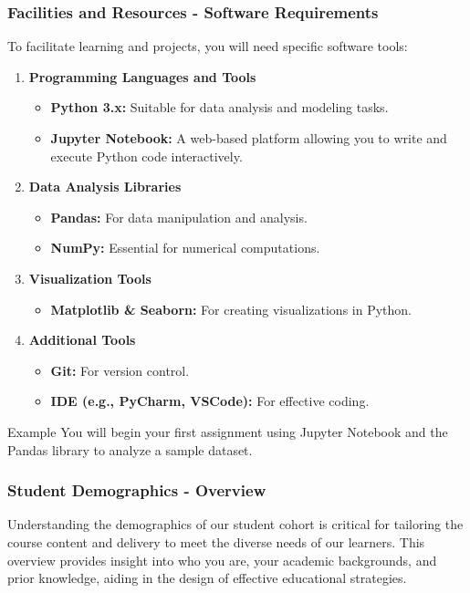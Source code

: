 \documentclass[aspectratio=169]{beamer}
\begin{document}
\begin{frame}[fragile]
    \frametitle{Facilities and Resources - Software Requirements}
    To facilitate learning and projects, you will need specific software tools:
    \begin{enumerate}
        \item \textbf{Programming Languages and Tools}
            \begin{itemize}
                \item \textbf{Python 3.x:} Suitable for data analysis and modeling tasks.
                \item \textbf{Jupyter Notebook:} A web-based platform allowing you to write and execute Python code interactively.
            \end{itemize}
        \item \textbf{Data Analysis Libraries}
            \begin{itemize}
                \item \textbf{Pandas:} For data manipulation and analysis.
                \item \textbf{NumPy:} Essential for numerical computations.
            \end{itemize}
        \item \textbf{Visualization Tools}
            \begin{itemize}
                \item \textbf{Matplotlib \& Seaborn:} For creating visualizations in Python.
            \end{itemize}
        \item \textbf{Additional Tools}
            \begin{itemize}
                \item \textbf{Git:} For version control.
                \item \textbf{IDE (e.g., PyCharm, VSCode):} For effective coding.
            \end{itemize}
    \end{enumerate}
    \begin{block}{Example}
        You will begin your first assignment using Jupyter Notebook and the Pandas library to analyze a sample dataset.
    \end{block}
\end{frame}

\begin{frame}[fragile]
    \frametitle{Student Demographics - Overview}
    
    Understanding the demographics of our student cohort is critical for tailoring the course content and delivery to meet the diverse needs of our learners. This overview provides insight into who you are, your academic backgrounds, and prior knowledge, aiding in the design of effective educational strategies.
\end{frame}
\end{document}
